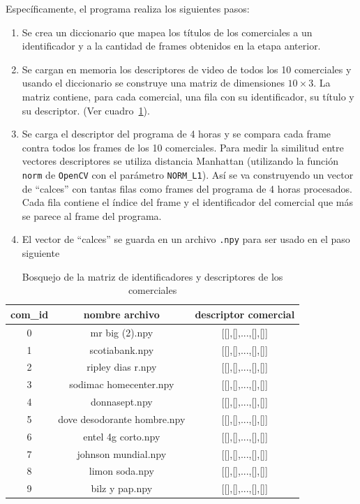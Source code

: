 \documentclass[14pt,letterpaper,hidelinks]{extarticle}
\begin{document}
Específicamente, el programa realiza los siguientes pasos:
\begin{enumerate}
\item Se crea un diccionario que mapea los títulos de los comerciales a un identificador y a la cantidad de frames obtenidos en la etapa anterior.
\item Se cargan en memoria los descriptores de video de todos los 10 comerciales y usando el diccionario se construye una matriz de dimensiones $10\times 3$. La matriz contiene, para cada comercial, una fila con su identificador, su título y su descriptor. (Ver cuadro~\ref{tab:descsCom}). 
\item Se carga el descriptor del programa de 4 horas y se compara cada frame contra todos los frames de los 10 comerciales. Para medir la similitud entre vectores descriptores se utiliza distancia Manhattan (utilizando la función \verb+norm+ de \verb+OpenCV+ con el parámetro \verb+NORM_L1+). Así se va construyendo un vector de ``calces'' con tantas filas como frames del programa de 4 horas procesados. Cada fila contiene el índice del frame y el identificador del comercial que más se parece al frame del programa.
\item El vector de ``calces'' se guarda en un archivo \verb+.npy+ para ser usado en el paso siguiente   
\end{enumerate} 
\begin{table}[]
\centering
\begin{tabular}{@{}ccc@{}}
\toprule
com\_id & nombre archivo & descriptor comercial \\ \midrule
0 & mr big (2).npy & {[}{[}{]},{[}{]},...,{[}{]},{[}{]}{]} \\
1 & scotiabank.npy & {[}{[}{]},{[}{]},...,{[}{]},{[}{]}{]} \\
2 & ripley dias r.npy & {[}{[}{]},{[}{]},...,{[}{]},{[}{]}{]} \\
3 & sodimac homecenter.npy & {[}{[}{]},{[}{]},...,{[}{]},{[}{]}{]} \\
4 & donnasept.npy & {[}{[}{]},{[}{]},...,{[}{]},{[}{]}{]} \\
5 & dove desodorante hombre.npy & {[}{[}{]},{[}{]},...,{[}{]},{[}{]}{]} \\
6 & entel 4g corto.npy & {[}{[}{]},{[}{]},...,{[}{]},{[}{]}{]} \\
7 & johnson mundial.npy & {[}{[}{]},{[}{]},...,{[}{]},{[}{]}{]} \\
8 & limon soda.npy & {[}{[}{]},{[}{]},...,{[}{]},{[}{]}{]} \\
9 & bilz y pap.npy & {[}{[}{]},{[}{]},...,{[}{]},{[}{]}{]} \\ \bottomrule
\end{tabular}
\captionsetup{justification=centering,margin=2cm}
\caption{Bosquejo de la matriz de identificadores y descriptores de los comerciales \label{tab:descsCom}}
\end{table}
\end{document}
